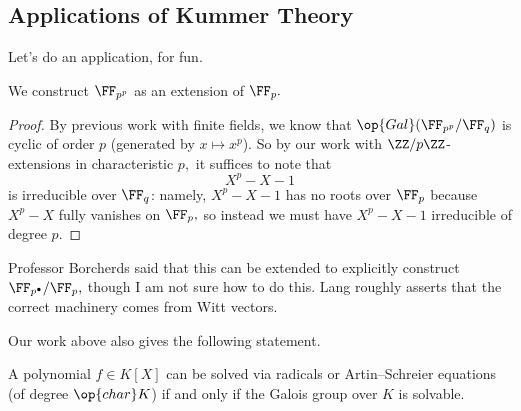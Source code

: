 \documentclass[../notes.tex]{subfiles}
\begin{document}
\subsection{Applications of Kummer Theory}
Let's do an application, for fun.
\begin{exe}
	We construct $\FF_{p^p}$ as an extension of $\FF_p.$
\end{exe}
\begin{proof}
	By previous work with finite fields, we know that $\op{Gal}(\FF_{p^p}/\FF_q)$ is cyclic of order $p$ (generated by $x\mapsto x^p$). So by our work with $\ZZ/p\ZZ$-extensions in characteristic $p,$ it suffices to note that
	\[X^p-X-1\]
	is irreducible over $\FF_q$: namely, $X^p-X-1$ has no roots over $\FF_p$ because $X^p-X$ fully vanishes on $\FF_p,$ so instead we must have $X^p-X-1$ irreducible of degree $p.$
\end{proof}
\begin{remark}
	Professor Borcherds said that this can be extended to explicitly construct $\FF_{p^\bullet}/\FF_p,$ though I am not sure how to do this. Lang roughly asserts that the correct machinery comes from Witt vectors.
\end{remark}
Our work above also gives the following statement.
\begin{theorem}
	A polynomial $f\in K[X]$ can be solved via radicals or Artin--Schreier equations (of degree $\op{char}K$) if and only if the Galois group over $K$ is solvable.
\end{theorem}
\end{document}
